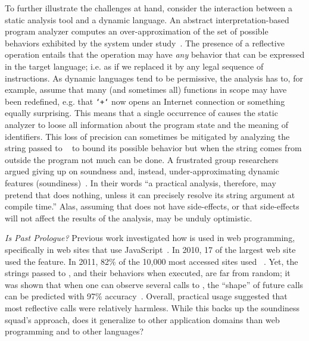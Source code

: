 \documentclass[USenglish,cleveref, autoref, thm-restate]{lipics-v2019}
\begin{document}
To further illustrate the challenges at hand, consider the interaction
between a static analysis tool and a dynamic language. An abstract
interpretation-based program analyzer computes an over-approximation
of the set of possible behaviors exhibited by the system under
study~\cite{cc77}. The presence of a reflective operation entails that
the operation may have \emph{any} behavior that can be expressed in
the target language; i.e. as if we replaced it by any legal sequence
of instructions.  As dynamic languages tend to be permissive, the
analysis has to, for example, assume that many (and sometimes all)
functions in scope may have been redefined, e.g. that \texttt{`+`} now
opens an Internet connection or something equally surprising. This
means that a single occurrence of \eval causes the static analyzer to
loose all information about the program state and the meaning of
identifiers. This loss of precision can sometimes be mitigated by
analyzing the string passed to \eval~\cite{} to bound its possible
behavior but when the string comes from outside the program not much
can be done.  A frustrated group researchers argued giving up on
soundness and, instead, under-approximating dynamic
features (soundiness)~\cite{soundy}. In their words ``a practical analysis,
therefore, may pretend that \eval does nothing, unless it can
precisely resolve its string argument at compile time.''  Alas,
assuming that \eval does not have side-effects, or that side-effects
will not affect the results of the analysis, may be unduly optimistic.

\vspace{2mm}\noindent\emph{Is Past Prologue?} Previous work
investigated how \eval is used in web programming, specifically in web
sites that use JavaScript~\cite{pldi10a}. In 2010, 17 of the largest
web site used the feature. In 2011, 82\% of the 10,000 most accessed
sites used \eval~\cite{ecoop11}.  Yet, the strings passed to \eval,
and their behaviors when executed, are far from random; it was shown
that when one can observe several calls to \eval, the ``shape'' of
future calls can be predicted with 97\% accuracy~\cite{oopsla12b}.
Overall, practical usage suggested that most reflective calls were
relatively harmless. While this backs up the soundiness squad's
approach, does it generalize to other application domains than web
programming and to other languages?
\end{document}
